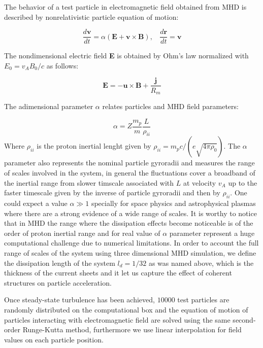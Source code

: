 \documentclass[%
aip,pop,amsmath,amssymb,
 reprint,%
]{revtex4-1}
\begin{document}
The behavior of a test particle in electromagnetic field obtained from MHD is described by 
nonrelativistic particle equation of motion:

\begin{equation}
  \frac{d\textbf{v}}{dt} = \alpha(\textbf{E} + \textbf{v} \times \textbf{B}), \ \ \ \  \frac{d\textbf{r}}{dt} = \textbf{v}
\end{equation}
 
The nondimensional electric field \textbf{E} is obtained by Ohm's law normalized with $E_0= v_A B_0/c$ as follows:

\begin{equation}
 \textbf{E} =  -\textbf{u}  \times \textbf{B} + \frac{\textbf{j}}{R_m} 
\end{equation}

The adimensional parameter $\alpha$ relates particles and MHD field parameters:

\begin{equation}
\alpha=Z\frac{m_p}{m}\frac{L}{\rho_{ii}}
\end{equation}
Where $\rho_{ii}$ is the proton inertial lenght given 
by $\rho_{ii}=m_pc/(e\sqrt{4\pi\rho_0})$. The $\alpha$ parameter also represents the nominal 
particle gyroradii and measures the range of scales involved in the system, in general the
fluctuations cover a broadband of the inertial range from slower timscale associated 
with $L$ at velocity $v_A$ up to the faster timescale given by the inverse of particle 
gyroradii and then by $\rho_{ii}$. One could expect a value
$\alpha \gg 1$ specially for space physics and astrophysical plasmas where there are a 
strong evidence of a wide range of scales. It is worthy to notice that in MHD the range 
where the dissipation effects become noticeable is of the order of proton inertial range and 
for real value of $\alpha$ parameter represent a huge computational challenge due to 
numerical limitations. In order to account the full range of scales of the system using 
three dimensional MHD simulation, we define the dissipation length of the system 
$l_d=1/32$ as was named above, which is the thickness of the current sheets and it let us
capture the effect of coherent structures on particle acceleration.

Once steady-state turbulence has been achieved, $10000$ test particles are randomly distributed 
on the computational box and the equation of motion of particles interacting with 
electromagnetic field are solved using the same second-order Runge-Kutta method, furthermore 
we use linear interpolation for field values on each particle position.
\end{document}
